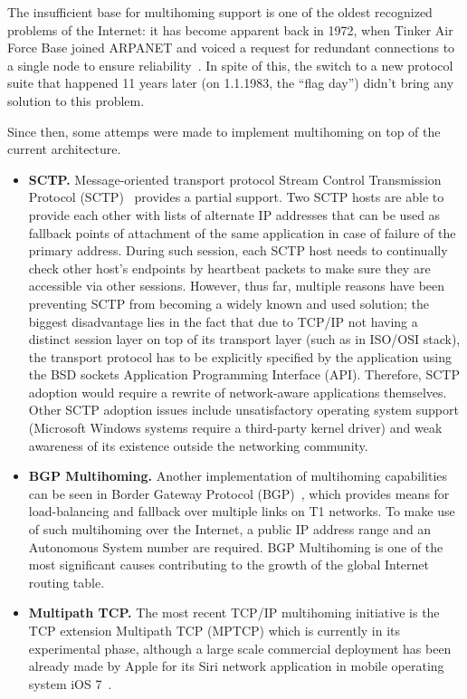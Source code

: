         The insufficient base for multihoming support is one of the oldest recognized problems of the Internet: it has become apparent back in 1972, when Tinker Air Force Base joined ARPANET and voiced a request for redundant connections to a single node to ensure reliability~\cite{Patterns}. In spite of this, the switch to a new protocol suite that happened 11 years later (on 1.1.1983, the ``flag day'') didn't bring any solution to this problem.

        Since then, some attemps were made to implement multihoming on top of the current architecture.

        \begin{itemize}
            \item \textbf{SCTP.}
            Message-oriented transport protocol Stream Control Transmission Protocol (SCTP)~\cite{rfc4960} provides a partial support. Two SCTP hosts are able to provide each other with lists of alternate IP addresses that can be used as fallback points of attachment of the same application in case of failure of the primary address. During such session, each SCTP host needs to continually check other host's endpoints by heartbeat packets to make sure they are accessible via other sessions.
            However, thus far, multiple reasons have been preventing SCTP from becoming a widely known and used solution; the biggest disadvantage lies in the fact that due to TCP/IP not having a distinct session layer on top of its transport layer (such as in ISO/OSI stack), the transport protocol has to be explicitly specified by the application using the BSD sockets Application Programming Interface (API). Therefore, SCTP adoption would require a rewrite of network-aware applications themselves. Other SCTP adoption issues include unsatisfactory operating system support (Microsoft Windows systems require a third-party kernel driver) and weak awareness of its existence outside the networking community.

            \item \textbf{BGP Multihoming.} Another implementation of multihoming capabilities can be seen in Border Gateway Protocol (BGP)~\cite{rfc4271}, which provides means for load-balancing and fallback over multiple links on T1 networks. To make use of such multihoming over the Internet, a public IP address range and an Autonomous System number are required. BGP Multihoming is one of the most significant causes contributing to the growth of the global Internet routing table.

            \item \textbf{Multipath TCP.} The most recent TCP/IP multihoming initiative is the TCP extension Multipath TCP (MPTCP) which is currently in its experimental phase, although a large scale commercial deployment has been already made by Apple for its Siri network application in mobile operating system iOS 7~\cite{Apple_MP}.
        \end{itemize}

